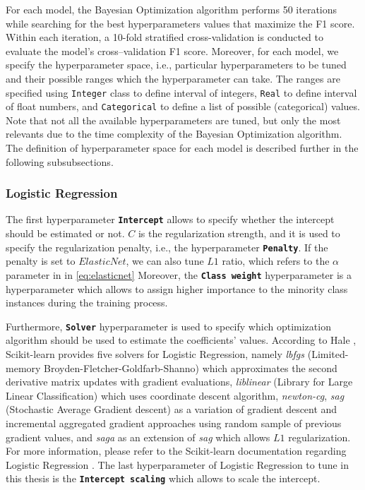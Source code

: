 For each model, the Bayesian Optimization algorithm performs 50 iterations while searching for the best hyperparameters values that maximize the F1 score. Within each iteration, a 10-fold stratified cross-validation is conducted to evaluate the model's cross--validation F1 score.
Moreover, for each model, we specify the hyperparameter space, i.e., particular hyperparameters to be tuned and their possible ranges which the hyperparameter can take. The ranges are specified using \lstinline{Integer} class to define interval of integers, \lstinline{Real} to define interval of float numbers, and \lstinline{Categorical} to define a list of possible (categorical) values.
Note that not all the available hyperparameters are tuned, but only the most relevants due to the time complexity of the Bayesian Optimization algorithm.
The definition of hyperparameter space for each model is described further in the following subsubsections.

\subsubsection{Logistic Regression}
The first hyperparameter \textbf{\texttt{Intercept}} allows to specify whether the intercept should be estimated or not.
$C$ is the regularization strength, and it is used to specify the regularization penalty, i.e., the hyperparameter \textbf{\texttt{Penalty}}.
If the penalty is set to $ElasticNet$, we can also tune $L1$ ratio, which refers to the $\alpha$ parameter in in \autoref{eq:elasticnet}
Moreover, the  \textbf{\texttt{Class weight}} hyperparameter is a hyperparameter which allows to assign higher importance to the minority class instances during the training process.

Furthermore, \textbf{\texttt{Solver}} hyperparameter is used to specify which optimization algorithm should be used to estimate the coefficients' values.
According to Hale \citep{hale2019dont}, Scikit-learn provides five solvers for Logistic Regression, namely \textit{lbfgs} (Limited-memory Broyden-Fletcher-Goldfarb-Shanno) which approximates the second derivative matrix updates with gradient evaluations, \textit{liblinear} (Library for Large Linear Classification) which uses coordinate descent algorithm, \textit{newton-cg},
\textit{sag} (Stochastic Average Gradient descent) as a variation of gradient descent and incremental aggregated gradient approaches using random sample of previous gradient values, and \textit{saga} as an extension of \textit{sag} which allows $L1$ regularization.
For more information, please refer to the Scikit-learn documentation regarding Logistic Regression \citep{scikit-lr}.
The last hyperparameter of Logistic Regression to tune in this thesis is the \textbf{\texttt{Intercept scaling}} which allows to scale the intercept.

